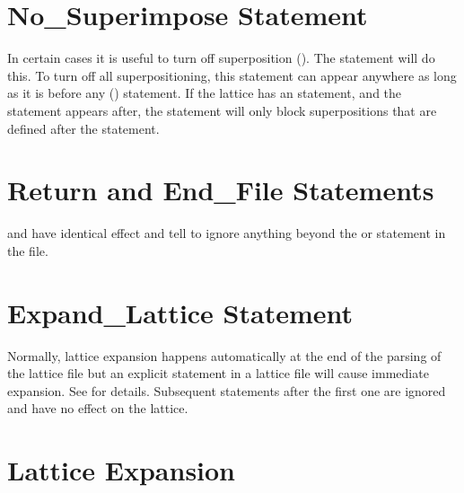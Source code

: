 {{{{{%
\section{No_Superimpose Statement}
\label{s:no.sup}

In certain cases it is useful to turn off superposition (). The 
statement will do this. To turn off all superpositioning, this statement can appear anywhere as long
as it is before any  () statement. If the lattice has an
 statement, and the  statement appears after, the
 statement will only block superpositions that are defined after the
 statement.

\section{Return and End_File Statements}

 and  have identical effect and tell \bmad to ignore anything beyond the
 or  statement in the file.

\section{Expand_Lattice Statement}
\label{s:expand.lat}

Normally, lattice expansion happens automatically at the end of the parsing of the lattice file but
an explicit  statement in a lattice file will cause immediate expansion. See
 for details. Subsequent  statements after the first one are
ignored and have no effect on the lattice.

\section{Lattice Expansion}
\label{s:expand}

}}}}}
